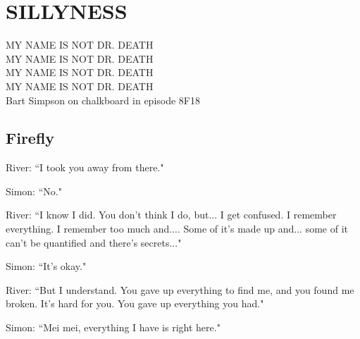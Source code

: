 \chapter{\texorpdfstring{SILLYNESS}{}} %
\setcounter{equation}{0}  

\noindent
MY NAME IS NOT DR. DEATH\\
MY NAME IS NOT DR. DEATH\\
MY NAME IS NOT DR. DEATH\\
MY NAME IS NOT DR. DEATH\\

	Bart Simpson on chalkboard in episode 8F18

\section{Firefly}
River: ``I took you away from there."

Simon: ``No."

River: ``I know I did. You don't think I do, but... I get confused. I remember
everything. I remember too much and.... Some of it's made up and... some of
it can't be quantified and there's secrets..."

Simon: ``It's okay."

River: ``But I understand. You gave up everything to find me, and you found me
broken. It's hard for you. You gave up everything you had."

Simon: ``Mei mei, everything I have is right here."
